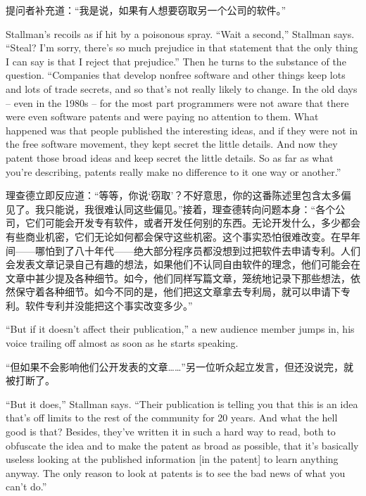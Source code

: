 \ifdefined\chs
提问者补充道：``我是说，如果有人想要窃取另一个公司的软件。''
\fi

\ifdefined\eng
Stallman's recoils as if hit by a poisonous spray. ``Wait a second,'' Stallman says. ``Steal? I'm sorry, there's so much prejudice in that statement that the only thing I can say is that I reject that prejudice.'' Then he turns to the substance of the question. ``Companies that develop nonfree software and other things keep lots and lots of trade secrets, and so that's not really likely to change. In the old days -- even in the 1980s -- for the most part programmers were not aware that there were even software patents and were paying no attention to them. What happened was that people published the interesting ideas, and if they were not in the free software movement, they kept secret the little details. And now they patent those broad ideas and keep secret the little details. So as far as what you're describing, patents really make no difference to it one way or another.''
\fi

\ifdefined\chs
理查德立即反应道：``等等，你说`窃取'？不好意思，你的这番陈述里包含太多偏见了。我只能说，我很难认同这些偏见。''接着，理查德转向问题本身：``各个公司，它们可能会开发专有软件，或者开发任何别的东西。无论开发什么，多少都会有些商业机密，它们无论如何都会保守这些机密。这个事实恐怕很难改变。在早年间——哪怕到了八十年代——绝大部分程序员都没想到过把软件去申请专利。人们会发表文章记录自己有趣的想法，如果他们不认同自由软件的理念，他们可能会在文章中甚少提及各种细节。如今，他们同样写篇文章，笼统地记录下那些想法，依然保守着各种细节。如今不同的是，他们把这文章拿去专利局，就可以申请下专利。软件专利并没能把这个事实改变多少。''
\fi

\ifdefined\eng
``But if it doesn't affect their publication,'' a new audience member jumps in, his voice trailing off almost as soon as he starts speaking.
\fi

\ifdefined\chs
``但如果不会影响他们公开发表的文章……''另一位听众起立发言，但还没说完，就被打断了。
\fi

\ifdefined\eng
``But it does,'' Stallman says. ``Their publication is telling you that this is an idea that's off limits to the rest of the community for 20 years. And what the hell good is that? Besides, they've written it in such a hard way to read, both to obfuscate the idea and to make the patent as broad as possible, that it's basically useless looking at the published information [in the patent] to learn anything anyway. The only reason to look at patents is to see the bad news of what you can't do.''
\fi

